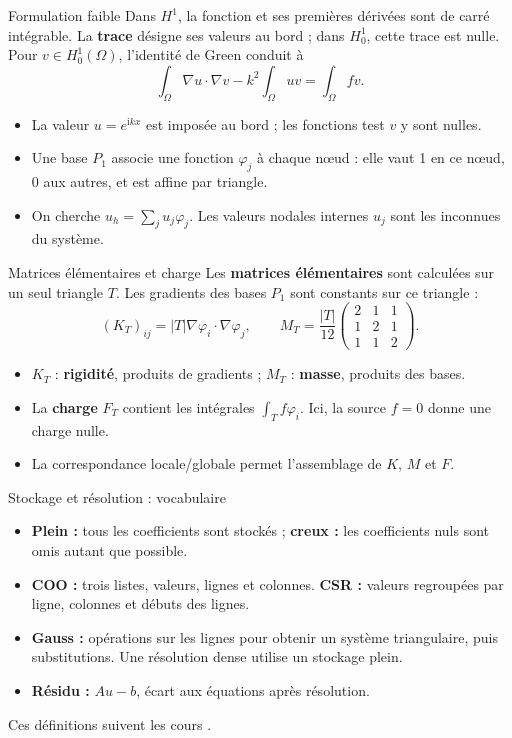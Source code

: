 \documentclass[12pt,aspectratio=169,t]{beamer}
\begin{document}
\begin{frame}{Formulation faible}
Dans $H^1$, la fonction et ses premières dérivées sont de carré intégrable. La \textbf{trace} désigne ses valeurs au bord ; dans $H^1_0$, cette trace est nulle. Pour $v\in H^1_0(\Omega)$, l'identité de Green conduit à \cite{fem}
\[
\int_\Omega\nabla u\cdot\nabla v-k^2\int_\Omega uv=\int_\Omega fv.
\]
\begin{itemize}
\item La valeur $u=e^{\mathrm{i}kx}$ est imposée au bord ; les fonctions test $v$ y sont nulles.
\item Une base $P_1$ associe une fonction $\varphi_j$ à chaque nœud : elle vaut 1 en ce nœud, 0 aux autres, et est affine par triangle.
\item On cherche $u_h=\sum_j u_j\varphi_j$. Les valeurs nodales internes $u_j$ sont les inconnues du système.
\end{itemize}
\end{frame}

\begin{frame}{Matrices élémentaires et charge}
Les \textbf{matrices élémentaires} sont calculées sur un seul triangle $T$. Les gradients des bases $P_1$ sont constants sur ce triangle \cite{fem} :
\[
(K_T)_{ij}=|T|\nabla\varphi_i\cdot\nabla\varphi_j,\qquad
M_T=\frac{|T|}{12}\begin{pmatrix}2&1&1\\1&2&1\\1&1&2\end{pmatrix}.
\]
\begin{itemize}
\item $K_T$ : \textbf{rigidité}, produits de gradients ; $M_T$ : \textbf{masse}, produits des bases.
\item La \textbf{charge} $F_T$ contient les intégrales $\int_T f\varphi_i$. Ici, la source $f=0$ donne une charge nulle.
\item La correspondance locale/globale permet l'assemblage de $K$, $M$ et $F$.
\end{itemize}
\end{frame}

\begin{frame}{Stockage et résolution : vocabulaire}
\begin{itemize}
\item \textbf{Plein :} tous les coefficients sont stockés ; \textbf{creux :} les coefficients nuls sont omis autant que possible.
\item \textbf{COO :} trois listes, valeurs, lignes et colonnes. \textbf{CSR :} valeurs regroupées par ligne, colonnes et débuts des lignes.
\item \textbf{Gauss :} opérations sur les lignes pour obtenir un système triangulaire, puis substitutions. Une résolution dense utilise un stockage plein.
\item \textbf{Résidu :} $Au-b$, écart aux équations après résolution.
\end{itemize}
Ces définitions suivent les cours \cite{fem,linear}.
\end{frame}
\end{document}
